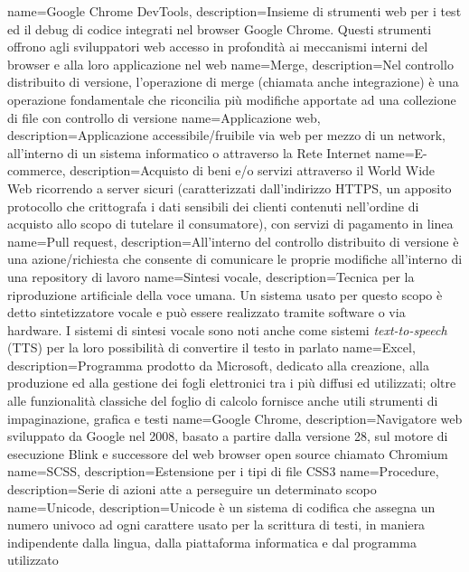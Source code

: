  {
	name=Google Chrome DevTools,
	description={Insieme di strumenti web per i test ed il debug di codice integrati nel browser Google Chrome. Questi strumenti offrono agli sviluppatori web accesso in profondità ai meccanismi interni del browser e alla loro applicazione nel web}
}
 {
	name=Merge,
	description={Nel controllo distribuito di versione, l'operazione di merge (chiamata anche integrazione) è una operazione fondamentale che riconcilia più modifiche apportate ad una collezione di file con controllo di versione}
}
 {
	name=Applicazione web,
	description={Applicazione accessibile/fruibile via web per mezzo di un network, all'interno di un sistema informatico o attraverso la Rete Internet}
}
 {
	name=E-commerce,
	description={Acquisto di beni e/o servizi attraverso il World Wide Web ricorrendo a server sicuri (caratterizzati dall'indirizzo HTTPS, un apposito protocollo che crittografa i dati sensibili dei clienti contenuti nell'ordine di acquisto allo scopo di tutelare il consumatore), con servizi di pagamento in linea}
}
 {
	name=Pull request,
	description={All'interno del controllo distribuito di versione è una azione/richiesta che consente di comunicare le proprie modifiche all'interno di una repository di lavoro}
}
 {
	name=Sintesi vocale,
	description={Tecnica per la riproduzione artificiale della voce umana. Un sistema usato per questo scopo è detto sintetizzatore vocale e può essere realizzato tramite software o via hardware. I sistemi di sintesi vocale sono noti anche come sistemi \textit{text-to-speech} (TTS) per la loro possibilità di convertire il testo in parlato}
}
 {
	name=Excel,
	description={Programma prodotto da Microsoft, dedicato alla creazione, alla produzione ed alla gestione dei fogli elettronici tra i più diffusi ed utilizzati; oltre alle funzionalità classiche del foglio di calcolo fornisce anche utili strumenti di impaginazione, grafica e testi}
}
 {
	name=Google Chrome,
	description={Navigatore web sviluppato da Google nel 2008, basato a partire dalla versione 28, sul motore di esecuzione Blink e successore del web browser open source chiamato Chromium}
}
 {
	name=SCSS,
	description={Estensione per i tipi di file CSS3}
}
 {
	name=Procedure,
	description={Serie di azioni atte a perseguire un determinato scopo}
}
 {
	name=Unicode,
	description={Unicode è un sistema di codifica che assegna un numero univoco ad ogni carattere usato per la scrittura di testi, in maniera indipendente dalla lingua, dalla piattaforma informatica e dal programma utilizzato}
}
